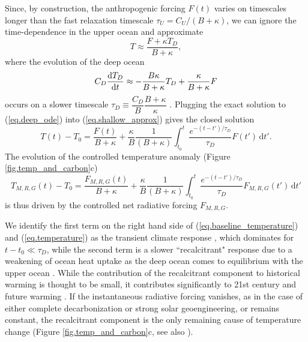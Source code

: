 \documentclass{article}
\begin{document}
Since, by construction, the anthropogenic forcing $F(t)$ varies on timescales longer than the fast relaxation timescale $\tau_{U} = C_{U}/(B + \kappa)$, we can ignore the time-dependence in the upper ocean and approximate
\begin{equation}
    T \approx \frac{F+\kappa T_{D}}{B + \kappa},
    \label{eq.shallow_approx}
\end{equation}
where the evolution of the deep ocean
\begin{equation}
    C_{D} \dv{T_{D}}{t} \approx - \frac{B \kappa}{B + \kappa} T_{D} + \frac{\kappa}{B + \kappa} F
    \label{eq.deep_ode}
\end{equation}
occurs on a slower timescale $\tau_{D} \equiv \dfrac{C_{D}}{B} \dfrac{B + \kappa}{\kappa}$ \citep{held_probing_2010}. Plugging the exact solution to (\ref{eq.deep_ode}) into (\ref{eq.shallow_approx}) gives the closed solution
\begin{equation}
    T(t) - T_{0} = \frac{F(t)}{B + \kappa} + \frac{\kappa}{B} \frac{1}{(B+\kappa)} \int_{t_{0}}^{t} \frac{ e^{-(t-t')/\tau_{D}}}{\tau_{D}} F(t') \, \text{d}t'.\label{eq.baseline_temperature}
\end{equation}
The evolution of the controlled temperature anomaly (Figure \ref{fig.temp_and_carbon}c)
\begin{equation}
    T_{M,R,G}(t) - T_{0} =  \frac{F_{M,R,G}(t)}{B + \kappa} + \frac{\kappa}{B} \frac{1}{(B+\kappa)} \int_{t_{0}}^{t} \frac{ e^{-(t-t')/\tau_{D}}}{\tau_{D}} F_{M,R,G}(t') \, \text{d}t'\label{eq.temperature}
\end{equation}
is thus driven by the controlled net radiative forcing $F_{M,R,G}$.

We identify the first term on the right hand side of (\ref{eq.baseline_temperature}) and (\ref{eq.temperature}) as the transient climate response \citep{gregory_transient_2008}, which dominates for $t-t_{0} \ll \tau_{D}$, while the second term is a slower ``recalcitrant" response due to a weakening of ocean heat uptake as the deep ocean comes to equilibrium with the upper ocean \citep{held_probing_2010}. While the contribution of the recalcitrant component to historical warming is thought to be small, it contributes significantly to 21st century and future warming \citep{gregory_transient_2008,held_probing_2010}. If the instantaneous radiative forcing vanishes, as in the case of either complete decarbonization or strong solar geoengineering, or remains constant, the recalcitrant component is the only remaining cause of temperature change (Figure \ref{fig.temp_and_carbon}c, see also \citealt{gregory_transient_2008, held_probing_2010, lickley_time_2019}).
\end{document}
